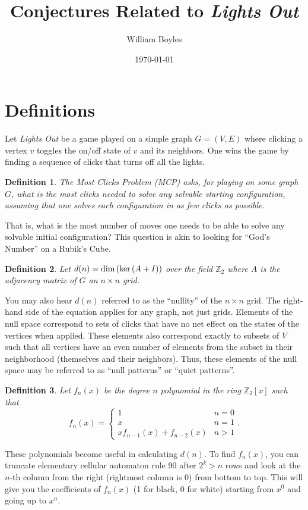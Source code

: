 \documentclass[a4paper]{article}
\newtheorem{definition}{Definition}
\newcommand{\Z}{\mathbb{Z}}
\renewcommand{\dim}[1]{\textnormal{dim}\left( #1 \right)}
\begin{document}
	\title{Conjectures Related to \textit{Lights Out}}
	\author{William Boyles}
	\date{\today}
	\maketitle
	
	\section{Definitions}
	Let \textit{Lights Out} be a game played on a simple graph $G = (V,E)$ where clicking a vertex $v$ toggles the on/off state of $v$ and its neighbors.
	One wins the game by finding a sequence of clicks that turns off all the lights.
	
	\begin{definition}
		The Most Clicks Problem (MCP) asks, for playing on some graph $G$, what is the most clicks needed to solve any solvable starting configuration, assuming that one solves each configuration in as few clicks as possible.
	\end{definition}
	That is, what is the most number of moves one needs to be able to solve any solvable initial configuration?
	This question is akin to looking for ``God's Number'' on a Rubik's Cube.

	\begin{definition}
		Let $d(n) = \dim{\ker{(A + I)}}$ over the field $\Z_2$ where $A$ is the adjacency matrix of $G$ an $n \times n$ grid.
	\end{definition}
	You may also hear $d(n)$ referred to as the ``nullity'' of the $n \times n$ grid.
	The right-hand side of the equation applies for any graph, not just grids.
	Elements of the null space correspond to sets of clicks that have no net effect on the states of the vertices when applied.
	These elements also correspond exactly to subsets of $V$ such that all vertices have an even number of elements from the subset in their neighborhood (themselves and their neighbors).
	Thus, these elements of the null space may be referred to as ``null patterns'' or ``quiet patterns''.
	
	\begin{definition}\label{def-polys}
		Let $f_n(x)$ be the degree $n$ polynomial in the ring $\Z_2[x]$ such that
		\begin{equation*}
			f_n(x) = \begin{cases}
				1 & n = 0 \\
				x & n = 1 \\
				x f_{n-1}(x) + f_{n-2}(x) & n > 1
			\end{cases}.
		\end{equation*}
	\end{definition}
	These polynomials become useful in calculating $d(n)$.
	To find $f_n(x)$, you can truncate elementary cellular automaton rule 90 after $2^k > n$ rows and look at the $n$-th column from the right (rightmost column is 0) from bottom to top.
	This will give you the coefficients of $f_n(x)$ (1 for black, 0 for white) starting from $x^0$ and going up to $x^n$.
\end{document}
